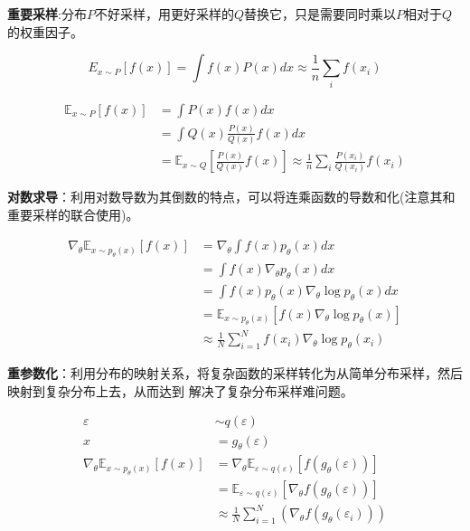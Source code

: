 \documentclass[UTF8]{ctexart}
\begin{document}


\textbf{重要采样}:分布$P$不好采样，用更好采样的$Q$替换它，只是需要同时乘以$P$相对于$Q$的权重因子。

\[
E_{x \sim P}[f(x)]=\int f(x) P(x) d x \approx \frac{1}{n} \sum_{i} f\left(x_{i}\right) \label{Important:Sample}
\]

\[
\begin{aligned}
\mathbb{E}_{x \sim P}[f(x)] &=\int P(x) f(x) d x \\
&=\int Q(x) \frac{P(x)}{Q(x)} f(x) d x \\
&=\mathbb{E}_{x \sim Q}\left[\frac{P(x)}{Q(x)} f(x)\right] \approx \frac{1}{n} \sum_{i} \frac{P\left(x_{i}\right)}{Q\left(x_{i}\right)} f\left(x_{i}\right)
\end{aligned}
\]

\textbf{对数求导}：利用对数导数为其倒数的特点，可以将连乘函数的导数和化(注意其和重要采样的联合使用)。

\[
\begin{aligned}
\nabla_{\theta} \mathbb{E}_{x \sim p_{\theta}(x)}[f(x)] &=\nabla_{\theta} \int f(x) p_{\theta}(x) d x \\
&=\int f(x) \nabla_{\theta} p_{\theta}(x) d x \\
&=\int f(x) p_{\theta}(x) \nabla_{\theta} \log p_{\theta}(x) d x \\
&=\mathbb{E}_{x \sim p_{\theta}(x)}\left[f(x) \nabla_{\theta} \log p_{\theta}(x)\right] \\
& \approx \frac{1}{N} \sum_{i=1}^{N} f\left(x_{i}\right) \nabla_{\theta} \log p_{\theta}\left(x_{i}\right)
\end{aligned}
\]


\textbf{重参数化}：利用分布的映射关系，将复杂函数的采样转化为从简单分布采样，然后映射到复杂分布上去，从而达到
解决了复杂分布采样难问题。

\[
\begin{aligned}
\varepsilon & \sim q(\varepsilon) \\
x &=g_{\theta}(\varepsilon) \\
\nabla_{\theta} \mathbb{E}_{x \sim p_{\theta}(x)}[f(x)] &=\nabla_{\theta} \mathbb{E}_{\varepsilon \sim q(\varepsilon)}\left[f\left(g_{\theta}(\varepsilon)\right)\right] \\
&=\mathbb{E}_{\varepsilon \sim q(\varepsilon)}\left[\nabla_{\theta} f\left(g_{\theta}(\varepsilon)\right)\right] \\
& \approx \frac{1}{N} \sum_{i=1}^{N}\left(\nabla_{\theta} f\left(g_{\theta}\left(\varepsilon_{i}\right)\right)\right)
\end{aligned}
\]
\end{document}
